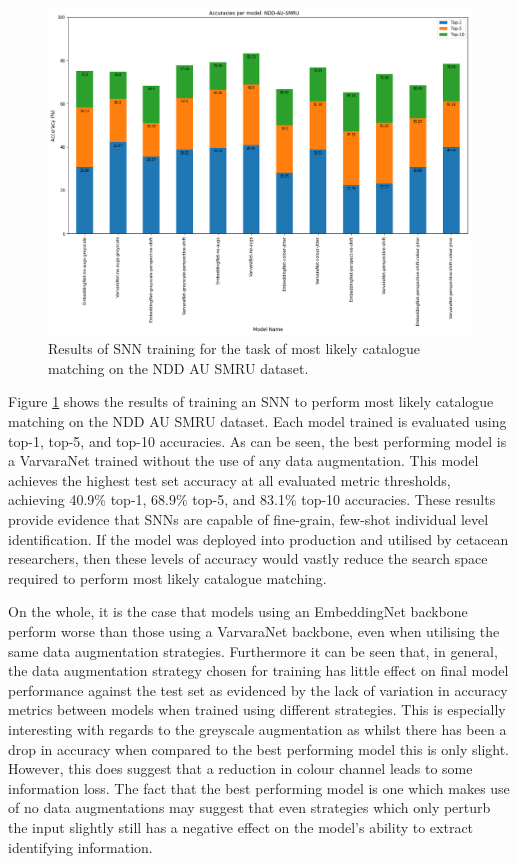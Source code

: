 \begin{figure}[t]
	\begin{center}
		\includegraphics[scale=0.4]{Chapter5/figs/NDDAUSMRU-SNN-model-accuracies.png}
	\end{center}
	\caption{Results of SNN training for the task of most likely catalogue matching on the NDD AU SMRU dataset.}
	\label{fig:NDDAUSMRU-SNN-model-accuracies}
\end{figure}

Figure \ref{fig:NDDAUSMRU-SNN-model-accuracies} shows the results of training an SNN to perform most likely catalogue matching on the NDD AU SMRU dataset. Each model trained is evaluated using top-1, top-5, and top-10 accuracies. As can be seen, the best performing model is a VarvaraNet trained without the use of any data augmentation. This model achieves the highest test set accuracy at all evaluated metric thresholds, achieving 40.9\% top-1, 68.9\% top-5, and 83.1\% top-10 accuracies. These results provide evidence that SNNs are capable of fine-grain, few-shot individual level identification. If the model was deployed into production and utilised by cetacean researchers, then these levels of accuracy would vastly reduce the search space required to perform most likely catalogue matching.

On the whole, it is the case that models using an EmbeddingNet backbone perform worse than those using a VarvaraNet backbone, even when utilising the same data augmentation strategies. Furthermore it can be seen that, in general, the data augmentation strategy chosen for training has little effect on final model performance against the test set as evidenced by the lack of variation in accuracy metrics between models when trained using different strategies. This is especially interesting with regards to the greyscale augmentation as whilst there has been a drop in accuracy when compared to the best performing model this is only slight. However, this does suggest that a reduction in colour channel leads to some information loss. The fact that the best performing model is one which makes use of no data augmentations may suggest that even strategies which only perturb the input slightly still has a negative effect on the model's ability to extract identifying information. 

